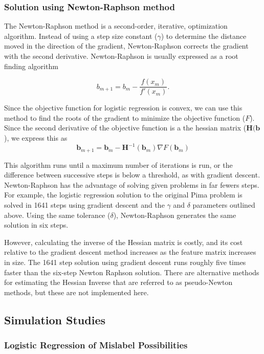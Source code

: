 \documentclass{article}
\begin{document}
\subsubsection*{Solution using Newton-Raphson method}

The Newton-Raphson method is a second-order, iterative, optimization algorithm. Instead of using a step size constant ($\gamma$) to determine the distance moved in the direction of the gradient, Newton-Raphson corrects the gradient with the second derivative. Newton-Raphson is usually expressed as a root finding algorithm

$$b_{m+1} = b_m - \frac{f(x_m)}{f'(x_m)}.$$ 

Since the objective function for logistic regression is convex, we can use this method to find the roots of the gradient to minimize the objective function ($F$). Since the second derivative of the objective function is a the hessian matrix ($\mathbf{H}(\mathbf{b}$), we express this as 
$$\mathbf{b}_{m+1} = \mathbf{b}_m - \mathbf{H}^{-1}(\mathbf{b}_m)\nabla F(\mathbf{b}_m)$$

This algorithm runs until a maximum number of iterations is run, or the difference between successive steps is below a threshold, as with gradient descent. Newton-Raphson has the advantage of solving given problems in far fewers steps. For example, the logistic regression solution to the original Pima problem is solved in 1641 steps using gradient descent and the $\gamma$ and $\delta$ parameters outlined above. Using the same tolerance ($\delta$), Newton-Raphson generates the same solution in six steps.

However, calculating the inverse of the Hessian matrix is costly, and its cost relative to the gradient descent method increases as the feature matrix increases in size. The 1641 step solution using gradient descent runs roughly five times faster than the six-step Newton Raphson solution. There are alternative methods for estimating the Hessian Inverse that are referred to as pseudo-Newton methods, but these are not implemented here. 



\subsection*{Simulation Studies}
\subsubsection*{Logistic Regression of Mislabel Possibilities}
\end{document}
